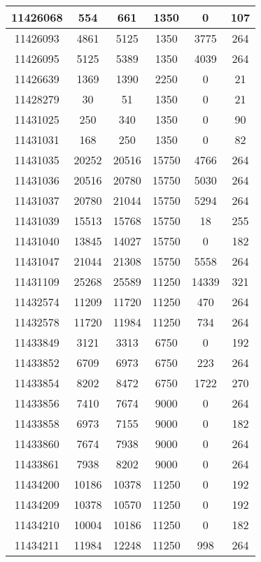 \begin{appendices}
\begin{center}
\begin{longtable}{|c|c|c|c|c|c|}
11426068 & 554   & 661   & 1350  & 0     & 107 \\ \hline
11426093 & 4861  & 5125  & 1350  & 3775  & 264 \\ \hline
11426095 & 5125  & 5389  & 1350  & 4039  & 264 \\ \hline
11426639 & 1369  & 1390  & 2250  & 0     & 21  \\ \hline
11428279 & 30    & 51    & 1350  & 0     & 21  \\ \hline
11431025 & 250   & 340   & 1350  & 0     & 90  \\ \hline
11431031 & 168   & 250   & 1350  & 0     & 82  \\ \hline
11431035 & 20252 & 20516 & 15750 & 4766  & 264 \\ \hline
11431036 & 20516 & 20780 & 15750 & 5030  & 264 \\ \hline
11431037 & 20780 & 21044 & 15750 & 5294  & 264 \\ \hline
11431039 & 15513 & 15768 & 15750 & 18    & 255 \\ \hline
11431040 & 13845 & 14027 & 15750 & 0     & 182 \\ \hline
11431047 & 21044 & 21308 & 15750 & 5558  & 264 \\ \hline
11431109 & 25268 & 25589 & 11250 & 14339 & 321 \\ \hline
11432574 & 11209 & 11720 & 11250 & 470   & 264 \\ \hline
11432578 & 11720 & 11984 & 11250 & 734   & 264 \\ \hline
11433849 & 3121  & 3313  & 6750  & 0     & 192 \\ \hline
11433852 & 6709  & 6973  & 6750  & 223   & 264 \\ \hline
11433854 & 8202  & 8472  & 6750  & 1722  & 270 \\ \hline
11433856 & 7410  & 7674  & 9000  & 0     & 264 \\ \hline
11433858 & 6973  & 7155  & 9000  & 0     & 182 \\ \hline
11433860 & 7674  & 7938  & 9000  & 0     & 264 \\ \hline
11433861 & 7938  & 8202  & 9000  & 0     & 264 \\ \hline
11434200 & 10186 & 10378 & 11250 & 0     & 192 \\ \hline
11434209 & 10378 & 10570 & 11250 & 0     & 192 \\ \hline
11434210 & 10004 & 10186 & 11250 & 0     & 182 \\ \hline
11434211 & 11984 & 12248 & 11250 & 998   & 264 \\ \hline

\end{longtable}
\end{center}
\end{appendices}
